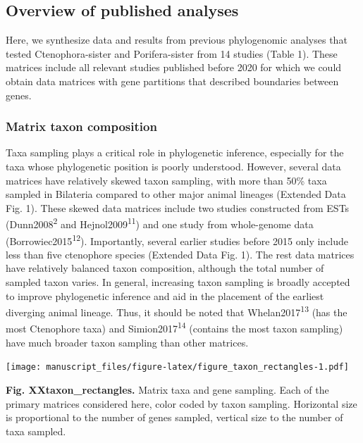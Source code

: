 \documentclass[]{article}
\begin{document}
\hypertarget{overview-of-published-analyses}{%
\subsection{Overview of published
analyses}\label{overview-of-published-analyses}}

Here, we synthesize data and results from previous phylogenomic analyses
that tested Ctenophora-sister and Porifera-sister from 14 studies (Table
1). These matrices include all relevant studies published before 2020
for which we could obtain data matrices with gene partitions that
described boundaries between genes.

\hypertarget{matrix-taxon-composition}{%
\subsubsection{Matrix taxon
composition}\label{matrix-taxon-composition}}

Taxa sampling plays a critical role in phylogenetic inference,
especially for the taxa whose phylogenetic position is poorly
understood. However, several data matrices have relatively skewed taxon
sampling, with more than 50\% taxa sampled in Bilateria compared to
other major animal lineages (Extended Data Fig. 1). These skewed data
matrices include two studies constructed from ESTs
(Dunn2008\textsuperscript{2} and Hejnol2009\textsuperscript{11}) and one
study from whole-genome data (Borrowiec2015\textsuperscript{12}).
Importantly, several earlier studies before 2015 only include less than
five ctenophore species (Extended Data Fig. 1). The rest data matrices
have relatively balanced taxon composition, although the total number of
sampled taxon varies. In general, increasing taxon sampling is broadly
accepted to improve phylogenetic inference and aid in the placement of
the earliest diverging animal lineage. Thus, it should be noted that
Whelan2017\textsuperscript{13} (has the most Ctenophore taxa) and
Simion2017\textsuperscript{14} (contains the most taxon sampling) have
much broader taxon sampling than other matrices.

\texttt{[image: manuscript\_files/figure-latex/figure\_taxon\_rectangles-1.pdf]}

\textbf{Fig. XXtaxon\_rectangles.} Matrix taxa and gene sampling. Each
of the primary matrices considered here, color coded by taxon sampling.
Horizontal size is proportional to the number of genes sampled, vertical
size to the number of taxa sampled.
\end{document}
